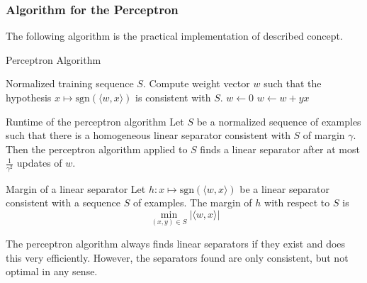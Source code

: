 \documentclass{panikzettel}
\begin{document}
\subsubsection{Algorithm for the Perceptron}
The following algorithm is the practical implementation of described concept.

\begin{halfboxl}
\vspace{-\baselineskip}
\begin{algo}{Perceptron Algorithm}
{
\renewcommand{\algorithmicrequire}{\textbf{Input:}}
\renewcommand{\algorithmicensure}{\textbf{Objective:}}
  \begin{algorithmic}[1]
  \Require Normalized training sequence $S$.
  \Ensure Compute weight vector $w$ such that the hypothesis $x\mapsto \text{sgn}(\langle w,x\rangle)$ is consistent with $S$.
  \State $w \leftarrow 0$
  \Repeat
  	\State $w\leftarrow w+yx$
  \EndIf
  \EndFor
  \end{algorithmic}
  }
\end{algo}
\end{halfboxl}
\begin{halfboxr}
\vspace{-\baselineskip}
\begin{theo}{Runtime of the perceptron algorithm}
Let $S$ be a normalized sequence of examples such that there is a homogeneous linear separator consistent with $S$ of margin $\gamma$. Then the perceptron algorithm applied to $S$ finds a linear separator after at most $\frac{1}{\gamma^2}$ updates of $w$.
\end{theo}

\begin{defi}{Margin of a linear separator}
Let $h:x\mapsto \text{sgn}(\langle w,x\rangle)$ be a linear separator consistent with a sequence $S$ of examples. The margin of $h$ with respect to $S$ is
\[
\min_{(x,y)\in S} |\langle w,x\rangle|
\]
\end{defi}
\end{halfboxr}

The perceptron algorithm always finds linear separators if they exist and does this very efficiently. However, the separators found are only consistent, but not optimal in any sense.
\end{document}
